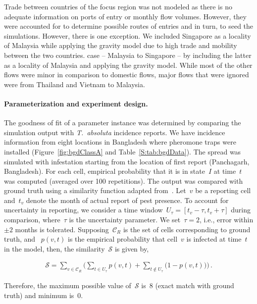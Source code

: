 \documentclass[11pt]{article}
\newcommand{\tuta}{\emph{T.~absoluta}}
\newcommand{\reportingCells}{\mathcal{C}_R}
\newcommand{\similarity}{\mathcal{S}}
\theoremstyle{definition}
\begin{document}
Trade between countries of the focus region was not modeled as there is no
adequate information on ports of entry or monthly flow volumes. However,
they were accounted for to determine possible routes of entries and in
turn, to seed the simulations. However, there is one exception. We included
Singapore as a locality of Malaysia while applying the gravity model due to
high trade and mobility between the two countries.  case -- Malaysia to
Singapore -- by including the latter as a locality of Malaysia and applying
the gravity model. While most of the other flows were minor in comparison
to domestic flows, major flows that were ignored were from Thailand and
Vietnam to Malaysia.

\paragraph{Parameterization and experiment design.}
The goodness of fit of a parameter instance was determined by comparing the
simulation output with \tuta{} incidence reports. We have incidence
information from eight locations in Bangladesh where pheromone traps were
installed (Figure~\ref{fig:bgdClassA} and Table~\ref{S:tab:bgdData}). The
spread was simulated with infestation starting from the location of first
report (Panchagarh, Bangladesh). For each cell, empirical probability that
it is in state~$I$ at time~$t$ was computed (averaged over 100
repetitions). The output was compared with ground truth using a similarity
function adapted from~\cite{carrasco2010unveiling}.  Let~$v$ be a reporting
cell and~$t_v$ denote the month of actual report of pest presence.  To
account for uncertainty in reporting, we consider a time
window~$U_\tau=[t_v-\tau,t_v+\tau]$ during comparison, where~$\tau$ is the
uncertainty parameter. We set~$\tau=2$, i.e., error within $\pm2$ months is
tolerated.  Supposing~$\reportingCells$ is the set of cells corresponding
to ground truth,  and ~$p(v,t)$ is the empirical probability that cell~$v$
is infected at time~$t$ in the model, then, the similarity~$\similarity$ is
given by,
\begin{linenomath}
\begin{align}\label{eqn:similarity}
    \similarity=\sum_{v\in\reportingCells} \Big(\sum_{t\in U_\tau}p(v,t)
    + \sum_{t\notin U_\tau}\big(1-p(v,t)\big) \Big)\,.
\end{align}
\end{linenomath}
Therefore, the maximum possible value
of~$\similarity$ is~$8$ (exact match with ground truth) and minimum is~$0$.
\end{document}
